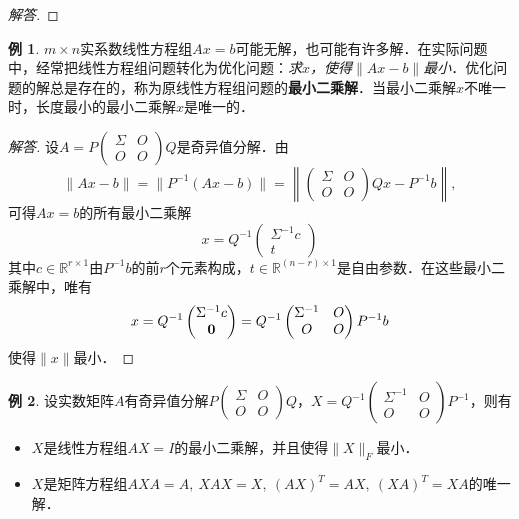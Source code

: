 \documentclass[a4paper,fontset=windows]{ctexbook}
\theoremstyle{definition}
\newtheorem{example}{例}[chapter]
\begin{document}
\begin{proof}[解答]
\end{proof}

\begin{example}\label{ex6.9}
$m\times n$实系数线性方程组$Ax=b$可能无解，也可能有许多解．在实际问题中，经常把线性方程组问题转化为优化问题：{\em 求$x$，使得$\|Ax-b\|$最小}．优化问题的解总是存在的，称为原线性方程组问题的{\bf 最小二乘解}．当最小二乘解$x$不唯一时，长度最小的最小二乘解$x$是唯一的．
\end{example}

\begin{proof}[解答]
设$A=P\begin{pmatrix}\Sigma&O \\ O&O\end{pmatrix}Q$是奇异值分解．由
$$\|Ax-b\|=\|P^{-1}(Ax-b)\|=\left\|\begin{pmatrix}\Sigma&O \\ O&O\end{pmatrix}Qx-P^{-1}b\right\|,$$
可得$Ax=b$的所有最小二乘解
$$x=Q^{-1}\begin{pmatrix}\Sigma^{-1}c \\ t\end{pmatrix}$$
其中$c\in\mathbb{R}^{r\times 1}$由$P^{-1}b$的前$r$个元素构成，$t\in\mathbb{R}^{(n-r)\times 1}$是自由参数．在这些最小二乘解中，唯有
$$x=Q^{-1}\begin{pmatrix}\Sigma^{-1}c \\ {\bf 0}
\end{pmatrix}=Q^{-1}\begin{pmatrix}\Sigma^{-1}&O \\ O&O\end{pmatrix}P^{-1}b$$
使得$\|x\|$最小．
\end{proof}

\begin{example}
设实数矩阵$A$有奇异值分解$P\begin{pmatrix}\Sigma&O \\ O&O\end{pmatrix}Q$，$X=Q^{-1}\begin{pmatrix}\Sigma^{-1}&O \\ O&O\end{pmatrix}P^{-1}$，则有
\begin{itemize}
\item[(1)] $X$是线性方程组$AX=I$的最小二乘解，并且使得$\|X\|_F$最小．
\item[(2)] $X$是矩阵方程组$AXA=A,~XAX=X,~(AX)^T=AX,~(XA)^T=XA$的唯一解．
\end{itemize}
\end{example}
\end{document}
